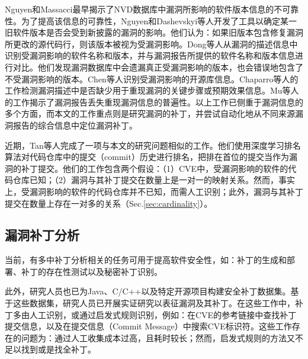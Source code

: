 Nguyen和Massacci\cite{nguyen2013reliability}最早揭示了NVD数据库中漏洞所影响的软件版本信息的不可靠性。为了提高该信息的可靠性，Nguyen\cite{nguyen2016automatic}和Dashevskyi等人\cite{dashevskyi2018screening}开发了工具以确定某一旧软件版本是否会受到新披露的漏洞的影响。他们认为：如果旧版本包含修复漏洞所更改的源代码行，则该版本被视为受漏洞影响。Dong等人\cite{dong2019towards}从漏洞的描述信息中识别受漏洞影响的软件名称和版本，并与漏洞报告所提供的软件名称和版本信息进行对比。他们发现漏洞数据库中会遗漏真正受漏洞影响的版本，也会错误地包含了不受漏洞影响的版本。Chen等人\cite{chen2020automated}识别受漏洞影响的开源库信息。Chaparro等人的工作\cite{chaparro2017detecting}检测漏洞描述中是否缺少用于重现漏洞的关键步骤或预期效果信息。Mu等人的工作\cite{mu2018understanding}揭示了漏洞报告丢失重现漏洞信息的普遍性。以上工作已侧重于漏洞信息的多个方面，而本文的工作重点则是研究漏洞的补丁，并尝试自动化地从不同来源漏洞报告的综合信息中定位漏洞补丁。

近期，Tan等人完成了一项与本文的研究问题相似的工作\cite{Tan2021locating}。他们使用深度学习排名算法对代码仓库中的提交（commit）历史进行排名，把排在首位的提交当作为漏洞的补丁提交。他们的工作包含两个假设：（1）CVE中，受漏洞影响的软件的代码仓库已知；（2）漏洞与其补丁提交在数量上是一对一的映射关系。然而，事实上，受漏洞影响的软件的代码仓库并不已知，而需人工识别；此外，漏洞与其补丁提交在数量上存在一对多的关系（Sec.\ref{sec:cardinality}）。


\subsection{漏洞补丁分析}
当前，有多中补丁分析相关的任务可用于提高软件安全性，如：补丁的生成和部署\cite{mulliner2013patchdroid,duan2019automating,xu2020automatic}、补丁的存在性测试\cite{zhang2018precise,jiang2020pdiff,dai2020bscout}以及秘密补丁识别\cite{xu2017spain,zhou2017automated,sabetta2018practical,chen2020machine}。

此外，研究人员也已为Java\cite{ponta2019manually}、C/C++\cite{fan2020ac}以及特定开源项目\cite{jimenez2018enabling}构建安全补丁数据集。基于这些数据集，研究人员已开展实证研究以表征漏洞及其补丁\cite{zaman2011security,li2017large,liu2020large,antal2020exploring}。在这些工作中，补丁多由人工识别\cite{xu2020automatic,jiang2020pdiff,dai2020bscout,xu2017spain,zhou2017automated,sabetta2018practical,chen2020machine,ponta2019manually,zaman2011security}，或通过启发式规则识别，例如：在CVE的参考链接中查找补丁提交信息\cite{duan2019automating,fan2020ac,jimenez2018enabling,li2017large,liu2020large}，以及在提交信息（Commit Message）中搜索CVE标识符\cite{fan2020ac, jimenez2018enabling, antal2020exploring}。这些工作存在的问题为：通过人工收集成本过高，且耗时较长；然而，启发式规则的方法又不足以找到或是找全补丁。


